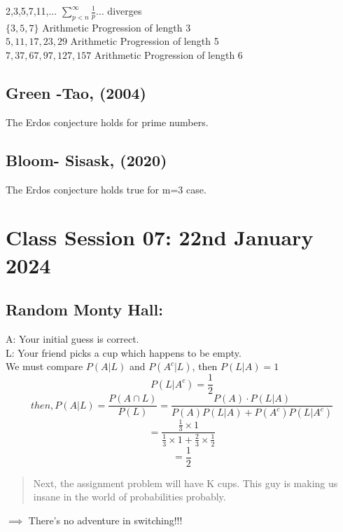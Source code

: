 \documentclass{article}
\theoremstyle{definition}
\begin{document}
{2,3,5,7,11,...
$\sum_{p < n}^{\infty } \frac{1}{p} \dots$ diverges\\
{$\{3,5,7\}$} Arithmetic Progression of length 3\\
{${5,11,17,23,29} $} Arithmetic Progression of length 5\\
{${7, 37, 67, 97, 127, 157}$} Arithmetic Progression of length 6\\

\subsection{Green -Tao, (2004)}
The Erdos conjecture holds for prime numbers.
\subsection{Bloom- Sisask, (2020)}
The Erdos conjecture holds true for m=3 case.


\subsection{}


\section{Class Session 07: 22nd January 2024}
\subsection{Random Monty Hall:}

A: Your initial guess is correct.\\
L: Your friend picks a cup which happens to be empty.\\
We must compare $P(A|L)$ and $P(A^c|L)$, then 
$P(L|A)=1$
$$P(L|A^c)= \frac{1}{2}$$
$$then, P(A|L)= \frac{P(A \cap L)}{P(L)} = \frac{P(A) \cdot P(L|A)}{P(A)P(L|A) + P(A^c)P(L|A^c)}$$
$$= \frac{\frac{1}{3} \times 1}{\frac{1}{3} \times 1 + \frac{2}{3} \times \frac{1}{2}}$$
$$= \frac{1}{2}$$
\begin{quote}
Next, the assignment problem will have K cups. This guy is making us insane in the world of probabilities probably.
    
\end{quote}

$\implies$ There's no adventure in switching!!!

}
\end{document}
